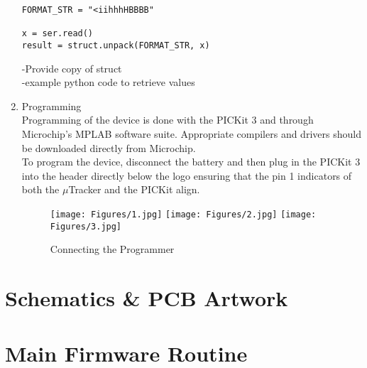 \documentclass[12pt,openany,a4paper]{book}
\begin{document}
\begin{enumerate}
\begin{lstlisting}
FORMAT_STR = "<iihhhHBBBB"

x = ser.read()
result = struct.unpack(FORMAT_STR, x)
		\end{lstlisting}
		
		-Provide copy of struct \\
		-example python code to retrieve values\\
	\item Programming \\
		Programming of the device is done with the PICKit 3 and through Microchip's MPLAB software suite. Appropriate compilers and drivers should be downloaded directly from Microchip. \\
		
		To program the device, disconnect the battery and then plug in the PICKit 3 into the header directly below the logo ensuring that the pin 1 indicators of both the $\mu$Tracker and the PICKit align. \\ 
		
			\begin{figure}[H]
				\centering
				\texttt{[image: Figures/1.jpg]}
				\texttt{[image: Figures/2.jpg]}
				\texttt{[image: Figures/3.jpg]}
				\caption{Connecting the Programmer}
				\label{fig:PROGRAMMING}
			\end{figure}
		
\end{enumerate}


\appendix


\newpage
{}
\mbox{}
\newpage



\chapter{Schematics \& PCB Artwork}
		
		
\chapter{Main Firmware Routine}

\end{document}
